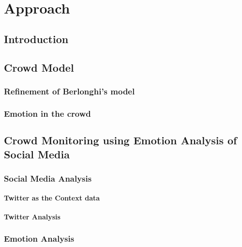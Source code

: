 \chapter{Approach}

\ifpdf
    \graphicspath{{Chapter3/Figs/Raster/}{Chapter3/Figs/PDF/}{Chapter3/Figs/}}
\else
    \graphicspath{{Chapter3/Figs/Vector/}{Chapter3/Figs/}}
\fi

\section{Introduction}

\section{Crowd Model}

\subsection{Refinement of Berlonghi's model}

\subsection{Emotion in the crowd}

\section{Crowd Monitoring using Emotion Analysis of Social Media}

\subsection{Social Media Analysis}

\subsubsection{Twitter as the Context data}

\subsubsection{Twitter Analysis}

\subsection{Emotion Analysis}

